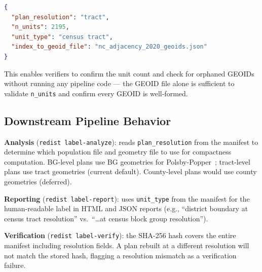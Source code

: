 \begin{lstlisting}[language=json]
{
  "plan_resolution": "tract",
  "n_units": 2195,
  "unit_type": "census tract",
  "index_to_geoid_file": "nc_adjacency_2020_geoids.json"
}
\end{lstlisting}

\noindent
This enables verifiers to confirm the unit count and check for orphaned GEOIDs
without running any pipeline code --- the GEOID file alone is sufficient to
validate \texttt{n\_units} and confirm every GEOID is well-formed.

\subsection{Downstream Pipeline Behavior}

\textbf{Analysis} (\texttt{redist label-analyze}): reads
\texttt{plan\_resolution} from the manifest to determine which population
file and geometry file to use for compactness computation.
BG-level plans use BG geometries for Polsby-Popper~\citep{polsby1991third};
tract-level plans use tract geometries (current default).
County-level plans would use county geometries (deferred).

\textbf{Reporting} (\texttt{redist label-report}): uses \texttt{unit\_type}
from the manifest for the human-readable label in HTML and JSON reports
(e.g., ``district boundary at census tract resolution'' vs.\ ``\ldots at
census block group resolution'').

\textbf{Verification} (\texttt{redist label-verify}): the SHA-256 hash
covers the entire manifest including resolution fields.
A plan rebuilt at a different resolution will not match the stored hash,
flagging a resolution mismatch as a verification failure.
